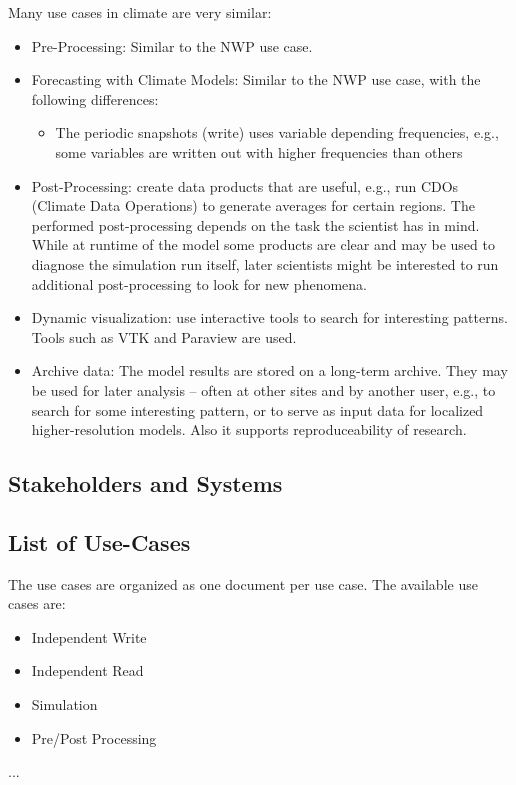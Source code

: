 Many use cases in climate are very similar:
\begin{itemize}
  \item Pre-Processing: Similar to the NWP use case.
  \item Forecasting with Climate Models: Similar to the NWP use case, with the following differences:
    \begin{itemize}
      \item The periodic snapshots (write) uses variable depending frequencies, e.g., some variables are written out with higher frequencies than others
    \end{itemize}
  \item Post-Processing: create data products that are useful, e.g., run CDOs (Climate Data Operations) to generate averages for certain regions. The performed post-processing depends on the task the scientist has in mind. While at runtime of the model some products are clear and may be used to diagnose the simulation run itself, later scientists might be interested to run additional post-processing to look for new phenomena.
  \item Dynamic visualization: use interactive tools to search for interesting patterns. Tools such as VTK and  Paraview are used. 
  \item Archive data: The model results are stored on a long-term archive. They may be used for later analysis --  often at other sites and by another user, e.g., to search for some interesting pattern, or to serve as input data for localized higher-resolution models. Also it supports reproduceability of research.
\end{itemize}

\subsection{Stakeholders and Systems}

\subsection{List of Use-Cases}

The use cases are organized as one document per use case. The available use cases are:
\begin{itemize}
  \item Independent Write
  \item Independent Read
  \item Simulation
  \item Pre/Post Processing
\end{itemize}

...
